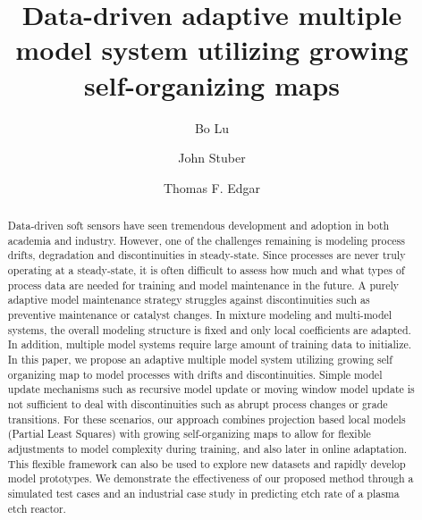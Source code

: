 \documentclass[review,3p]{elsarticle}
\renewcommand\[{\begin{equation}}
\renewcommand\]{\end{equation}}
\begin{document}
\begin{frontmatter}
\title{Data-driven adaptive multiple model system utilizing growing self-organizing maps}

\author[dow]{Bo Lu }
\author[vsli]{John Stuber}
\author[uta]{Thomas F. Edgar}
\address[dow]{Analytical Technology Center, The Dow Chemical Company, Freeport, Texas}
\address[vsli]{Smart Manufacturing Systems Group, VLSIP Technologies Inc., Richardson, TX}
\address[uta]{McKetta Department of Chemical Engineering, The University of Texas at Austin, Austin, Texas}


\begin{abstract}
Data-driven soft sensors have seen tremendous development and adoption in both academia and industry. However, one of the challenges remaining is modeling process drifts, degradation and discontinuities in steady-state. Since processes are never truly operating at a steady-state, it is often difficult to assess how much and what types of process data are needed for training and model maintenance in the future. A purely adaptive model maintenance strategy struggles against discontinuities such as preventive maintenance or catalyst changes. In mixture modeling and multi-model systems, the overall modeling structure is fixed and only local coefficients are adapted. In addition, multiple model systems require large amount of training data to initialize. In this paper, we propose an adaptive multiple model system utilizing growing self organizing map to model processes with drifts and discontinuities. Simple model update mechanisms such as recursive model update or moving window model update is not sufficient to deal with discontinuities such as abrupt process changes or grade transitions. For these scenarios, our approach combines projection based local models (Partial Least Squares) with growing self-organizing maps to allow for flexible adjustments to model complexity during training, and also later in online adaptation. This flexible framework can also be used to explore new datasets and rapidly develop model prototypes. We demonstrate the effectiveness of our proposed method through a simulated test cases and an industrial case study in predicting etch rate of a plasma etch reactor.
\end{abstract}


\end{frontmatter}
\end{document}
